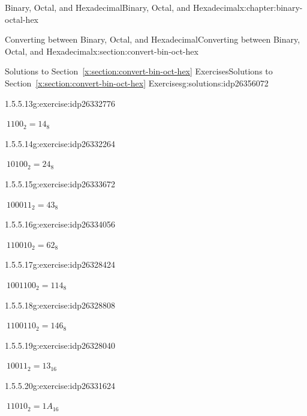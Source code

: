 \documentclass[twoside,10pt,]{book}
\newcommand{\xreffont}{\relax}
\numberwithin{equation}{section}
\begin{document}
\begin{chapterptx}{Binary, Octal, and Hexadecimal}{}{Binary, Octal, and Hexadecimal}{}{}{x:chapter:binary-octal-hex}
\begin{sectionptx}{Converting between Binary, Octal, and Hexadecimal}{}{Converting between Binary, Octal, and Hexadecimal}{}{}{x:section:convert-bin-oct-hex}
\begin{solutions-subsection}{Solutions to Section~{\xreffont\ref*{x:section:convert-bin-oct-hex}} Exercises}{}{Solutions to Section~{\xreffont\ref*{x:section:convert-bin-oct-hex}} Exercises}{}{}{g:solutions:idp26356072}
\begin{exercisegroup}
\begin{divisionsolutioneg}{1.5.5.13}{}{g:exercise:idp26332776}%
\par\smallskip%
\noindent\hypertarget{g:solution:idp26332392-main}{}\(\ 1100_2=14_8\)\end{divisionsolutioneg}%
\begin{divisionsolutioneg}{1.5.5.14}{}{g:exercise:idp26332264}%
\par\smallskip%
\noindent\hypertarget{g:solution:idp26328936-main}{}\(\ 10100_2=24_8\)\end{divisionsolutioneg}%
\begin{divisionsolutioneg}{1.5.5.15}{}{g:exercise:idp26333672}%
\par\smallskip%
\noindent\hypertarget{g:solution:idp26331368-main}{}\(\ 100011_2=43_8\)\end{divisionsolutioneg}%
\begin{divisionsolutioneg}{1.5.5.16}{}{g:exercise:idp26334056}%
\par\smallskip%
\noindent\hypertarget{g:solution:idp26328680-main}{}\(\ 110010_2=62_8\)\end{divisionsolutioneg}%
\begin{divisionsolutioneg}{1.5.5.17}{}{g:exercise:idp26328424}%
\par\smallskip%
\noindent\hypertarget{g:solution:idp26329064-main}{}\(\ 1001100_2=114_8\)\end{divisionsolutioneg}%
\begin{divisionsolutioneg}{1.5.5.18}{}{g:exercise:idp26328808}%
\par\smallskip%
\noindent\hypertarget{g:solution:idp26333544-main}{}\(\ 1100110_2=146_8\)\end{divisionsolutioneg}%
\end{exercisegroup}
\par\medskip\noindent
\begin{exercisegroup}
\begin{divisionsolutioneg}{1.5.5.19}{}{g:exercise:idp26328040}%
\par\smallskip%
\noindent\hypertarget{g:solution:idp26334312-main}{}\(\ 10011_2=13_{16}\)\end{divisionsolutioneg}%
\begin{divisionsolutioneg}{1.5.5.20}{}{g:exercise:idp26331624}%
\par\smallskip%
\noindent\hypertarget{g:solution:idp26335208-main}{}\(\ 11010_2=1A_{16}\)\end{divisionsolutioneg}%

\end{exercisegroup}
\end{solutions-subsection}
\end{sectionptx}
\end{chapterptx}
\end{document}
